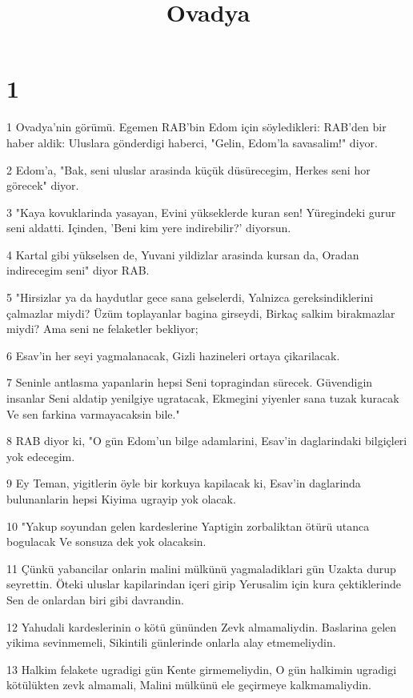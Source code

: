 

\title{Ovadya}


\chapter{1}

\par 1 Ovadya'nin görümü. Egemen RAB'bin Edom için söyledikleri: RAB'den bir haber aldik: Uluslara gönderdigi haberci, "Gelin, Edom'la savasalim!" diyor.
\par 2 Edom'a, "Bak, seni uluslar arasinda küçük düsürecegim, Herkes seni hor görecek" diyor.
\par 3 "Kaya kovuklarinda yasayan, Evini yükseklerde kuran sen! Yüregindeki gurur seni aldatti. Içinden, 'Beni kim yere indirebilir?' diyorsun.
\par 4 Kartal gibi yükselsen de, Yuvani yildizlar arasinda kursan da, Oradan indirecegim seni" diyor RAB.
\par 5 "Hirsizlar ya da haydutlar gece sana gelselerdi, Yalnizca gereksindiklerini çalmazlar miydi? Üzüm toplayanlar bagina girseydi, Birkaç salkim birakmazlar miydi? Ama seni ne felaketler bekliyor;
\par 6 Esav'in her seyi yagmalanacak, Gizli hazineleri ortaya çikarilacak.
\par 7 Seninle antlasma yapanlarin hepsi Seni topragindan sürecek. Güvendigin insanlar Seni aldatip yenilgiye ugratacak, Ekmegini yiyenler sana tuzak kuracak Ve sen farkina varmayacaksin bile."
\par 8 RAB diyor ki, "O gün Edom'un bilge adamlarini, Esav'in daglarindaki bilgiçleri yok edecegim.
\par 9 Ey Teman, yigitlerin öyle bir korkuya kapilacak ki, Esav'in daglarinda bulunanlarin hepsi Kiyima ugrayip yok olacak.
\par 10 "Yakup soyundan gelen kardeslerine Yaptigin zorbaliktan ötürü utanca bogulacak Ve sonsuza dek yok olacaksin.
\par 11 Çünkü yabancilar onlarin malini mülkünü yagmaladiklari gün Uzakta durup seyrettin. Öteki uluslar kapilarindan içeri girip Yerusalim için kura çektiklerinde Sen de onlardan biri gibi davrandin.
\par 12 Yahudali kardeslerinin o kötü gününden Zevk almamaliydin. Baslarina gelen yikima sevinmemeli, Sikintili günlerinde onlarla alay etmemeliydin.
\par 13 Halkim felakete ugradigi gün Kente girmemeliydin, O gün halkimin ugradigi kötülükten zevk almamali, Malini mülkünü ele geçirmeye kalkmamaliydin.
